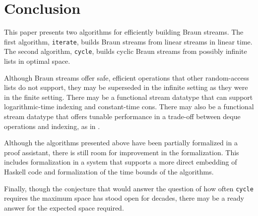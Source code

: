 \documentclass[envcountsect]{llncs}
\begin{document}
\begin{comment}
how many lines?
how many generated lines?
hiccups:
* subtraction
* repeated function application not built-in (show equal to another formulation)
\end{comment}

\section{Conclusion}
\label{conclSect}

This paper presents two algorithms for efficiently building Braun streams.
The first algorithm, {\tt iterate}, builds Braun streams from linear streams in linear time.
The second algorithm, {\tt cycle}, builds cyclic Braun streams from possibly infinite lists in optimal space.

Although Braun streams offer safe, efficient operations that other random-access lists do not support, they may be superseded in the infinite setting as they were in the finite setting.
There may be a functional stream datatype that can support logarithmic-time indexing and constant-time cons.
There may also be a functional stream datatype that offers tunable performance in a trade-off between deque operations and indexing, as in \cite{hinzeArray}.

Although the algorithms presented above have been partially formalized in a proof assistant, there is still room for improvement in the formalization.
This includes formalization in a system that supports a more direct embedding of Haskell code and formalization of the time bounds of the algorithms.

Finally, though the conjecture that would answer the question of how often {\tt cycle} requires the maximum space has stood open for decades, there may be a ready answer for the expected space required.

\begin{comment}
Also good for finite Braun trees, because can get index i in time $i$, not $n+i$

complete formalization
\end{comment}



\end{document}
